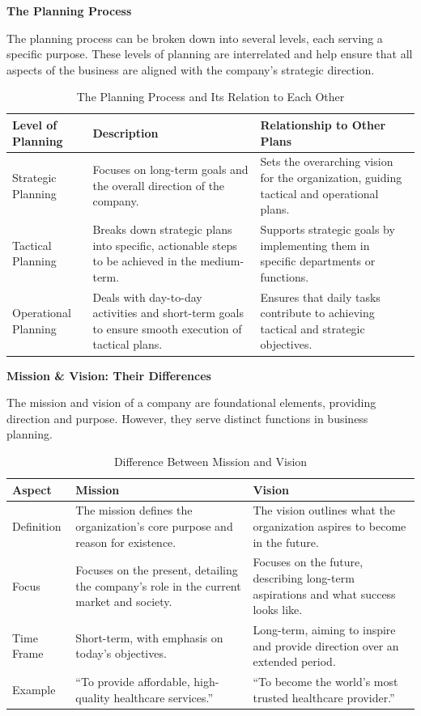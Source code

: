 \documentclass[10pt,a4paper]{book}
\begin{document}
\vspace{0.5cm}

\textbf{The Planning Process}

The planning process can be broken down into several levels, each serving a specific purpose. These levels of planning are interrelated and help ensure that all aspects of the business are aligned with the company's strategic direction.

\begin{table}[ht]
\centering
\begin{tabular}{|p{3cm}|p{6cm}|p{6cm}|}
\hline
\textbf{Level of Planning} & \textbf{Description} & \textbf{Relationship to Other Plans} \\ \hline
Strategic Planning & Focuses on long-term goals and the overall direction of the company. & Sets the overarching vision for the organization, guiding tactical and operational plans. \\ \hline
Tactical Planning & Breaks down strategic plans into specific, actionable steps to be achieved in the medium-term. & Supports strategic goals by implementing them in specific departments or functions. \\ \hline
Operational Planning & Deals with day-to-day activities and short-term goals to ensure smooth execution of tactical plans. & Ensures that daily tasks contribute to achieving tactical and strategic objectives. \\ \hline
\end{tabular}
\caption{The Planning Process and Its Relation to Each Other}
\end{table}

\vspace{0.5cm}

\textbf{Mission \& Vision: Their Differences}

The mission and vision of a company are foundational elements, providing direction and purpose. However, they serve distinct functions in business planning.

\begin{table}[ht]
\centering
\begin{tabular}{|p{2cm}|p{9cm}|p{6cm}|}
\hline
\textbf{Aspect} & \textbf{Mission} & \textbf{Vision} \\ \hline
Definition & The mission defines the organization’s core purpose and reason for existence. & The vision outlines what the organization aspires to become in the future. \\ \hline
Focus & Focuses on the present, detailing the company’s role in the current market and society. & Focuses on the future, describing long-term aspirations and what success looks like. \\ \hline
Time Frame & Short-term, with emphasis on today’s objectives. & Long-term, aiming to inspire and provide direction over an extended period. \\ \hline
Example & “To provide affordable, high-quality healthcare services.” & “To become the world’s most trusted healthcare provider.” \\ \hline
\end{tabular}
\caption{Difference Between Mission and Vision}
\end{table}
\end{document}
